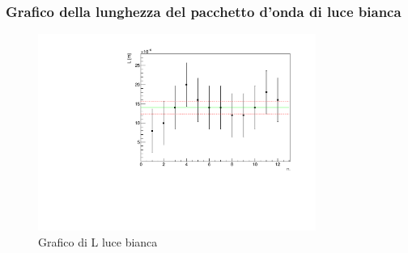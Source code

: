 \subsubsection{Grafico della lunghezza del pacchetto d'onda di luce bianca}
\begin{figure}[H]
    \centering
    \includegraphics[width=0.81\textwidth]{graphpacc.pdf}
    \caption{Grafico di L luce bianca}
\end{figure}